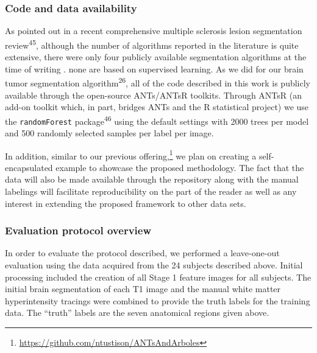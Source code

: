 \documentclass[11pt,]{article}
\let\rmarkdownfootnote\footnote%
\def\footnote{\protect\rmarkdownfootnote}
\begin{document}
\subsubsection{Code and data
availability}\label{code-and-data-availability}

As pointed out in a recent comprehensive multiple sclerosis lesion
segmentation review\textsuperscript{45}, although the number of
algorithms reported in the literature is quite extensive, there were
only four publicly available segmentation algorithms at the time of
writing .
 none are
based on supervised learning. As we did for our brain tumor segmentation
algorithm\textsuperscript{26}, all of the code described in this work is
publicly available through the open-source ANTs/ANTsR toolkits. Through
ANTsR (an add-on toolkit which, in part, bridges ANTs and the R
statistical project) we use the \texttt{randomForest}
package\textsuperscript{46} using the default settings with 2000 trees
per model and 500 randomly selected samples per label per image.

In addition, similar to our previous offering,\footnote{\url{https://github.com/ntustison/ANTsAndArboles}}
we plan on creating a self-encapsulated example to showcase the proposed
methodology. The fact that the data will also be made available through
the
repository along with the manual labelings will facilitate
reproducibility on the part of the reader as well as any interest in
extending the proposed framework to other data sets.

\subsubsection{Evaluation protocol
overview}\label{evaluation-protocol-overview}

In order to evaluate the protocol described, we performed a
leave-one-out evaluation using the data acquired from the 24 subjects
described above. Initial processing included the creation of all Stage 1
feature images for all subjects. The initial brain segmentation of each
T1 image and the manual white matter hyperintensity tracings were
combined to provide the truth labels for the training data. The
``truth'' labels are the seven anatomical regions given above.
\end{document}
